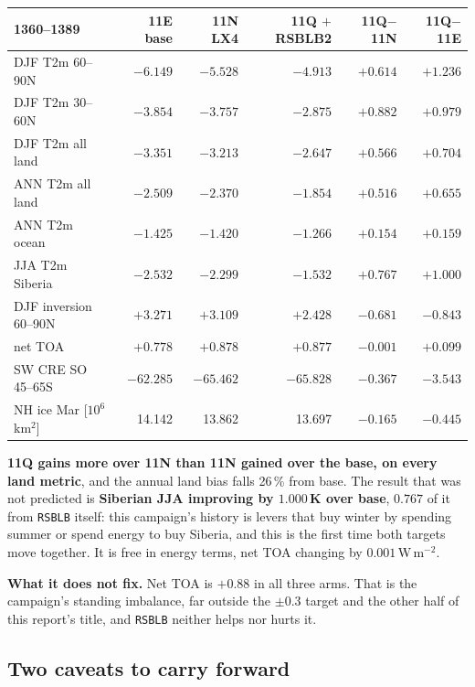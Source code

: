 \documentclass[10pt]{article}
\begin{document}
\begin{center}\small
\begin{tabular}{lrrrrr}
\toprule
1360--1389 & 11E base & 11N LX4 & \textbf{11Q $+$RSBLB2} & 11Q$-$11N & 11Q$-$11E \\
\midrule
DJF T2m 60--90N & $-6.149$ & $-5.528$ & $\mathbf{-4.913}$ & $+0.614$ & $+1.236$ \\
DJF T2m 30--60N & $-3.854$ & $-3.757$ & $\mathbf{-2.875}$ & $+0.882$ & $+0.979$ \\
DJF T2m all land & $-3.351$ & $-3.213$ & $\mathbf{-2.647}$ & $+0.566$ & $+0.704$ \\
ANN T2m all land & $-2.509$ & $-2.370$ & $\mathbf{-1.854}$ & $+0.516$ & $+0.655$ \\
ANN T2m ocean & $-1.425$ & $-1.420$ & $-1.266$ & $+0.154$ & $+0.159$ \\
JJA T2m Siberia & $-2.532$ & $-2.299$ & $\mathbf{-1.532}$ & $+0.767$ & $+1.000$ \\
DJF inversion 60--90N & $+3.271$ & $+3.109$ & $\mathbf{+2.428}$ & $-0.681$ & $-0.843$ \\
net TOA & $+0.778$ & $+0.878$ & $+0.877$ & $-0.001$ & $+0.099$ \\
SW CRE SO 45--65S & $-62.285$ & $-65.462$ & $-65.828$ & $-0.367$ & $-3.543$ \\
NH ice Mar [$10^6$\,km$^2$] & 14.142 & 13.862 & 13.697 & $-0.165$ & $-0.445$ \\
\bottomrule
\end{tabular}
\end{center}

\textbf{11Q gains more over 11N than 11N gained over the base, on every land metric}, and
the annual land bias falls 26\,\% from base. The result that was not predicted is
\textbf{Siberian JJA improving by $1.000$\,K over base}, $0.767$ of it from \texttt{RSBLB}
itself: this campaign's history is levers that buy winter by spending summer or spend
energy to buy Siberia, and this is the first time both targets move together. It is free
in energy terms, net TOA changing by $0.001$\,W\,m$^{-2}$.

\textbf{What it does not fix.} Net TOA is $+0.88$ in all three arms. That is the
campaign's standing imbalance, far outside the $\pm0.3$ target and the other half of this
report's title, and \texttt{RSBLB} neither helps nor hurts it.

\subsection{Two caveats to carry forward}\label{sub:r32caveats}
\end{document}
